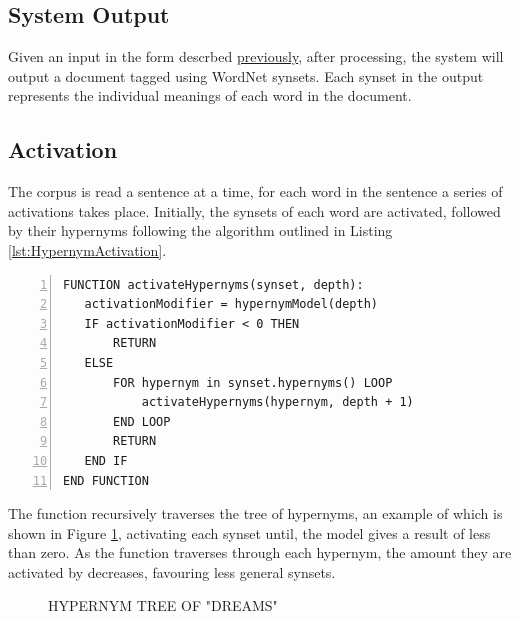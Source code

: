 \documentclass[]{article}
\begin{document}
\subsection{System Output}
\label{sec:SysOutput}
Given an input in the form descrbed \hyperref[sec:CorpusAnalysis]{previously}, after processing, the system will output a document tagged using WordNet synsets. Each synset in the output represents the individual meanings of each word in the document.

\subsection{Activation}
\label{sec:activation} 

The corpus is read a sentence at a time, for each word in the sentence a series of activations takes place. Initially, the synsets of each word are activated, followed by their hypernyms following the algorithm outlined in Listing \ref{lst:HypernymActivation}.

\begin{lstlisting}[numbers=left, numberstyle=\small, caption={Hypernym Activation}, captionpos=b, label={lst:HypernymActivation}]
FUNCTION activateHypernyms(synset, depth):
   activationModifier = hypernymModel(depth)
   IF activationModifier < 0 THEN
       RETURN
   ELSE
       FOR hypernym in synset.hypernyms() LOOP
           activateHypernyms(hypernym, depth + 1)
       END LOOP
       RETURN
   END IF
END FUNCTION
\end{lstlisting}

The function recursively traverses the tree of hypernyms, an example of which is shown in Figure \ref{fig:hypernymTree}, activating each synset until, the model gives a result of less than zero. As the function traverses through each hypernym, the amount they are activated by decreases, favouring less general synsets.

\begin{figure}[h]
\caption{HYPERNYM TREE OF "DREAMS"}
\label{fig:hypernymTree}
\end{figure}
\end{document}
